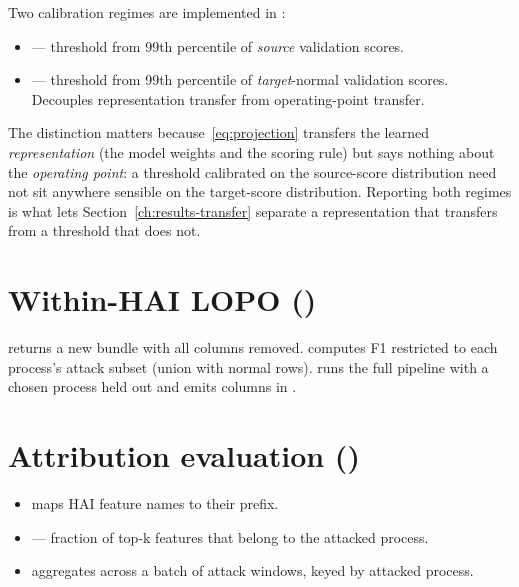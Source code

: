 Two calibration regimes are implemented in :
\begin{itemize}
  \item {} --- threshold from 99th percentile of \emph{source} validation scores.
  \item {} --- threshold from 99th percentile of \emph{target}-normal validation scores.  Decouples representation transfer from operating-point transfer.
\end{itemize}
The distinction matters because~\eqref{eq:projection} transfers the learned \emph{representation} (the model weights and the scoring rule) but says nothing about the \emph{operating point}: a threshold calibrated on the source-score distribution need not sit anywhere sensible on the target-score distribution.  Reporting both regimes is what lets Section~\ref{ch:results-transfer} separate a representation that transfers from a threshold that does not.

\section{Within-HAI LOPO ()}

 returns a new bundle with all  columns removed.   computes F1 restricted to each process's attack subset (union with normal rows).   runs the full pipeline with a chosen process held out and emits  columns in .

\section{Attribution evaluation ()}

\begin{itemize}
  \item {} maps HAI feature names to their  prefix.
  \item {} --- fraction of top-k features that belong to the attacked process.
  \item {} aggregates across a batch of attack windows, keyed by attacked process.
\end{itemize}

